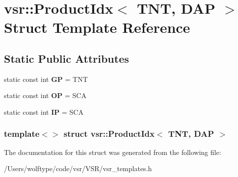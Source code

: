 \hypertarget{structvsr_1_1_product_idx_3_01_t_n_t_00_01_d_a_p_01_4}{\section{vsr\-:\-:Product\-Idx$<$ T\-N\-T, D\-A\-P $>$ Struct Template Reference}
\label{structvsr_1_1_product_idx_3_01_t_n_t_00_01_d_a_p_01_4}
}
\subsection*{Static Public Attributes}
\begin{DoxyCompactItemize}
\item 
\hypertarget{structvsr_1_1_product_idx_3_01_t_n_t_00_01_d_a_p_01_4_a1b840bdf29a1f4036b690ccf4b707197}{static const int {\bfseries G\-P} = T\-N\-T}\label{structvsr_1_1_product_idx_3_01_t_n_t_00_01_d_a_p_01_4_a1b840bdf29a1f4036b690ccf4b707197}

\item 
\hypertarget{structvsr_1_1_product_idx_3_01_t_n_t_00_01_d_a_p_01_4_ae263dc039527ed58f353bce8396724e3}{static const int {\bfseries O\-P} = S\-C\-A}\label{structvsr_1_1_product_idx_3_01_t_n_t_00_01_d_a_p_01_4_ae263dc039527ed58f353bce8396724e3}

\item 
\hypertarget{structvsr_1_1_product_idx_3_01_t_n_t_00_01_d_a_p_01_4_a7f5194233168a5575c051cba7adbae4e}{static const int {\bfseries I\-P} = S\-C\-A}\label{structvsr_1_1_product_idx_3_01_t_n_t_00_01_d_a_p_01_4_a7f5194233168a5575c051cba7adbae4e}

\end{DoxyCompactItemize}
\subsubsection*{template$<$$>$ struct vsr\-::\-Product\-Idx$<$ T\-N\-T, D\-A\-P $>$}



The documentation for this struct was generated from the following file\-:\begin{DoxyCompactItemize}
\item 
/\-Users/wolftype/code/vsr/\-V\-S\-R/vsr\-\_\-templates.\-h\end{DoxyCompactItemize}
